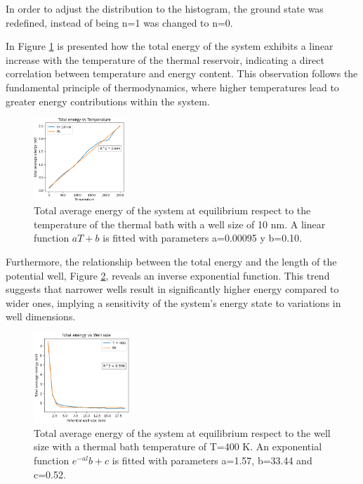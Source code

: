 \documentclass[%
 reprint,
 amsmath,amssymb,
 aps,
]{revtex4-2}
\begin{document}
In order to adjust the distribution to the histogram, the ground state was redefined, instead of being n=1 was changed to n=0. 

In Figure \ref{fig:evst} is presented how the total energy of the system exhibits a linear increase with the temperature of the thermal reservoir, indicating a direct correlation between temperature and energy content. This observation follows the fundamental principle of thermodynamics, where higher temperatures lead to greater energy contributions within the system.
\begin{figure}[h!]
    \centering \includegraphics[width=0.31\textwidth]{TvsE.png} 
    \caption{Total average energy of the system at equilibrium respect to the temperature of the thermal bath with a well size of 10 nm. A linear function $aT+b$ is fitted with parameters a=0.00095 y b=0.10.}
    \label{fig:evst}
\end{figure}

Furthermore, the relationship between the total energy and the length of the potential well, Figure \ref{fig:svse}, reveals an inverse exponential function. This trend suggests that narrower wells result in significantly higher energy compared to wider ones, implying a sensitivity of the system's energy state to variations in well dimensions.
\begin{figure}[h!]
    \centering \includegraphics[width=0.32\textwidth]{EvsL.png} 
    \caption{Total average energy of the system at equilibrium respect to the well size with a thermal bath temperature of T=400 K. An exponential function $e^{-al}b+c$ is fitted with parameters a=1.57, b=33.44 and c=0.52.}
    \label{fig:svse}
\end{figure}
\end{document}
